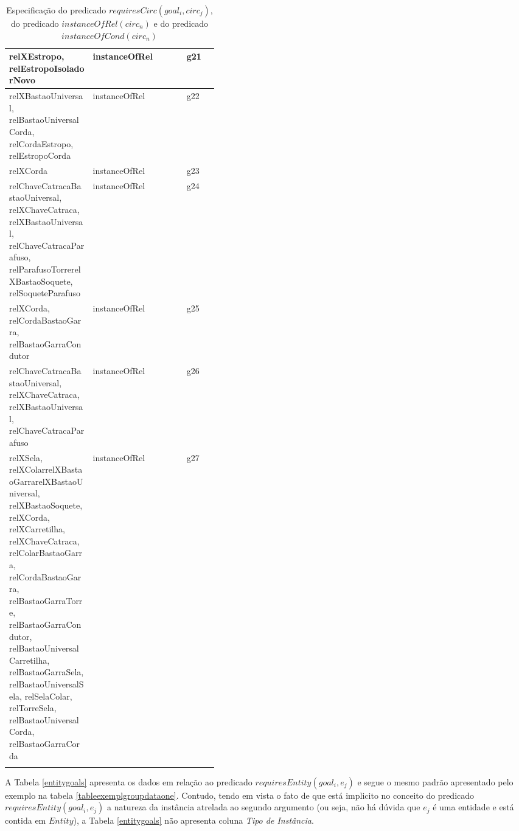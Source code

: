 \begin{center}
\begin{longtable}[H]{|p{0.4\linewidth}|l|l|}
relXEstropo, relEstropoIsoladorNovo                                                                              									& instanceOfRel              		 & g21        \\ \hline
relXBastaoUniversal, relBastaoUniversalCorda, relCordaEstropo, relEstropoCorda                                     									& instanceOfRel              		 & g22        \\ \hline
relXCorda                                                                                                       									& instanceOfRel              		 & g23        \\ \hline
relChaveCatracaBastaoUniversal, relXChaveCatraca, relXBastaoUniversal, relChaveCatracaParafuso, relParafusoTorrerelXBastaoSoquete, relSoqueteParafuso 	& instanceOfRel						 & g24        \\ \hline
relXCorda, relCordaBastaoGarra, relBastaoGarraCondutor                                                            									& instanceOfRel						 & g25        \\ \hline
relChaveCatracaBastaoUniversal, relXChaveCatraca, relXBastaoUniversal, relChaveCatracaParafuso                     									& instanceOfRel						 & g26        \\ \hline
relXSela, relXColarrelXBastaoGarrarelXBastaoUniversal, relXBastaoSoquete, relXCorda, relXCarretilha, relXChaveCatraca, relColarBastaoGarra, relCordaBastaoGarra, relBastaoGarraTorre, relBastaoGarraCondutor, relBastaoUniversalCarretilha, relBastaoGarraSela, relBastaoUniversalSela, relSelaColar, relTorreSela, relBastaoUniversalCorda, relBastaoGarraCorda 									& instanceOfRel						 & g27  \\ \hline
\caption{Especificação do predicado $requiresCirc(goal_i,circ_j)$, do predicado $instanceOfRel(circ_n)$ e do predicado $instanceOfCond(circ_n)$}
\label{relationsgroup1}
\end{longtable}
\end{center}

A Tabela \ref{entitygoals} apresenta os dados em relação ao predicado $requiresEntity(goal_i, e_j)$ e segue o mesmo padrão apresentado pelo exemplo na tabela \ref{tableexemplgroupdataone}. Contudo, tendo em vista o fato de que está implicito no conceito do predicado $requiresEntity(goal_i, e_j)$ a natureza da instância atrelada ao segundo argumento (ou seja, não há dúvida que $e_j$ é uma entidade e está contida em $Entity$), a Tabela \ref{entitygoals} não apresenta coluna \textit{Tipo de Instância}.

